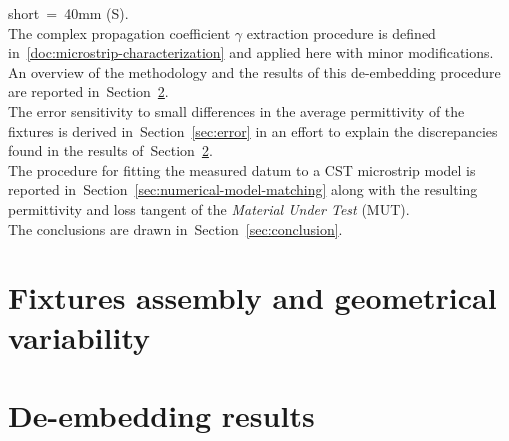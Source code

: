 \documentclass[11pt,a4paper]{article}
\newcommand{\sref}[1]{Section~\ref{#1}}
\begin{document}
    short~=~40mm (S).\\
    The complex propagation coefficient $\gamma$ extraction procedure is defined in~\ref{doc:microstrip-characterization} and
    applied here with minor modifications.
    An overview of the methodology and the results of this de-embedding procedure are reported in~\sref{sec:de-embedding}.\\
    The error sensitivity to small differences in the average permittivity of the fixtures is derived in~\sref{sec:error}
    in an effort to explain the discrepancies found in the results of~\sref{sec:de-embedding}.\\
    The procedure for fitting the measured datum to a CST microstrip model is reported in~\sref{sec:numerical-model-matching}
    along with the resulting permittivity and loss tangent of the \emph{Material Under Test} (MUT).\\
    The conclusions are drawn in~\sref{sec:conclusion}.


    \section{Fixtures assembly and geometrical variability}
    \label{sec:assembly}


    \section{De-embedding results}
    \label{sec:de-embedding}


\end{document}
